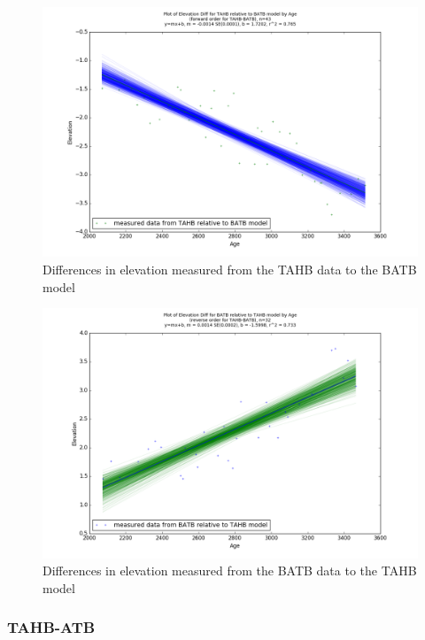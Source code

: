 \newpage

\begin{figure}[h]
	\includegraphics[width=0.9\linewidth]{data/bothNonZero/withinSeventyFivePercent/gias/theGIA_TAHB_relative_to_BATB.png}
	\caption{Differences in elevation measured from the TAHB data to the BATB model}
	\label{fig:gias_TAHBxBATB}
\end{figure}
\newpage


\begin{figure}[h]
	\includegraphics[width=0.9\linewidth]{data/bothNonZero/withinSeventyFivePercent/gias/theGIA_BATB_relative_to_TAHB.png}
	\caption{Differences in elevation measured from the BATB data to the TAHB model}
	\label{fig:gias_BATBxTAHB}
\end{figure}
\newpage






\subsubsection{TAHB-ATB}

